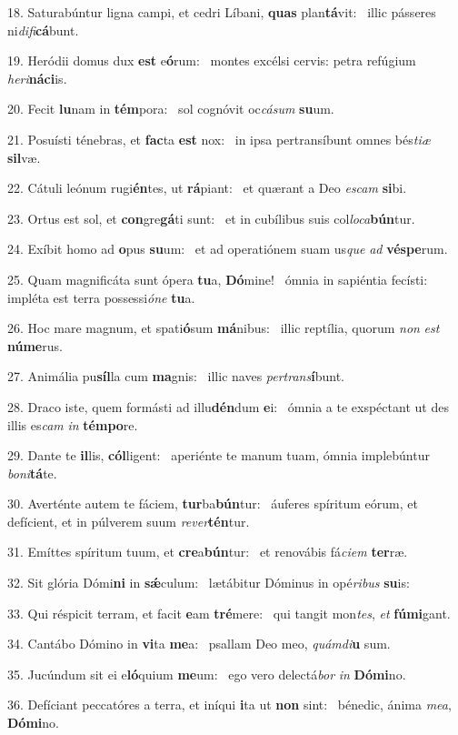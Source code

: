 18. Saturabúntur ligna campi, et cedri Líbani, \textbf{quas} plan\textbf{tá}vit: \ast\  illic pásseres ni\textit{di}\textit{fi}\textbf{cá}bunt.\

19. Heródii domus dux \textbf{est} e\textbf{ó}rum: \ast\  montes excélsi cervis: petra refúgium \textit{he}\textit{ri}\textbf{ná}\textbf{ci}is.\

20. Fecit \textbf{lu}nam in \textbf{tém}pora: \ast\  sol cognóvit oc\textit{cá}\textit{sum} \textbf{su}um.\

21. Posuísti ténebras, et \textbf{fac}ta \textbf{est} nox: \ast\  in ipsa pertransíbunt omnes bés\textit{ti}\textit{æ} \textbf{sil}væ.\

22. Cátuli leónum rugi\textbf{én}tes, ut \textbf{rá}piant: \ast\  et quærant a Deo \textit{es}\textit{cam} \textbf{si}bi.\

23. Ortus est sol, et \textbf{con}gre\textbf{gá}ti sunt: \ast\  et in cubílibus suis col\textit{lo}\textit{ca}\textbf{bún}tur.\

24. Exíbit homo ad \textbf{o}pus \textbf{su}um: \ast\  et ad operatiónem suam us\textit{que} \textit{ad} \textbf{vés}\textbf{pe}rum.\

25. Quam magnificáta sunt ópera \textbf{tu}a, \textbf{Dó}mine! \ast\  ómnia in sapiéntia fecísti: impléta est terra possessi\textit{ó}\textit{ne} \textbf{tu}a.\

26. Hoc mare magnum, et spati\textbf{ó}sum \textbf{má}nibus: \ast\  illic reptília, quorum \textit{non} \textit{est} \textbf{nú}\textbf{me}rus.\

27. Animália pu\textbf{síl}la cum \textbf{ma}gnis: \ast\  illic naves \textit{per}\textit{trans}\textbf{í}bunt.\

28. Draco iste, quem formásti ad illu\textbf{dén}dum \textbf{e}i: \ast\  ómnia a te exspéctant ut des illis es\textit{cam} \textit{in} \textbf{tém}\textbf{po}re.\

29. Dante te \textbf{il}lis, \textbf{cól}ligent: \ast\  aperiénte te manum tuam, ómnia implebúntur \textit{bo}\textit{ni}\textbf{tá}te.\

30. Averténte autem te fáciem, \textbf{tur}ba\textbf{bún}tur: \ast\  áuferes spíritum eórum, et defícient, et in púlverem suum \textit{re}\textit{ver}\textbf{tén}tur.\

31. Emíttes spíritum tuum, et \textbf{cre}a\textbf{bún}tur: \ast\  et renovábis fá\textit{ci}\textit{em} \textbf{ter}ræ.\

32. Sit glória Dómi\textbf{ni} in \textbf{sǽ}culum: \ast\  lætábitur Dóminus in opé\textit{ri}\textit{bus} \textbf{su}is:\

33. Qui réspicit terram, et facit \textbf{e}am \textbf{tré}mere: \ast\  qui tangit mon\textit{tes}, \textit{et} \textbf{fú}\textbf{mi}gant.\

34. Cantábo Dómino in \textbf{vi}ta \textbf{me}a: \ast\  psallam Deo meo, \textit{quám}\textit{di}\textbf{u} sum.\

35. Jucúndum sit ei e\textbf{ló}quium \textbf{me}um: \ast\  ego vero delectá\textit{bor} \textit{in} \textbf{Dó}\textbf{mi}no.\

36. Defíciant peccatóres a terra, et iníqui \textbf{i}ta ut \textbf{non} sint: \ast\  bénedic, ánima \textit{me}\textit{a}, \textbf{Dó}\textbf{mi}no.\


